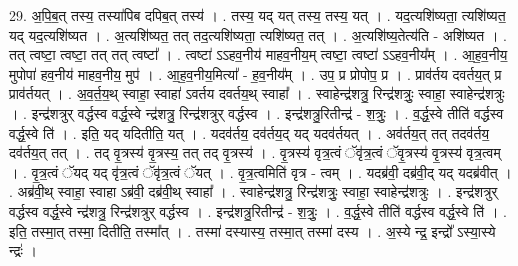 \documentclass[17pt]{extarticle}
\begin{document}
29. अ॒पि॒ब॒त् तस्य॒ तस्या॑पिब दपिब॒त् तस्य॑ । . तस्य॒ यद् यत् तस्य॒ तस्य॒ यत् । . यद॒त्यशि॑ष्यता॒ त्यशि॑ष्यत॒ यद् यद॒त्यशि॑ष्यत । . अ॒त्यशि॑ष्यत॒ तत् तद॒त्यशि॑ष्यता॒ त्यशि॑ष्यत॒ तत् । . अ॒त्यशि॑ष्य॒तेत्य॑ति - अशि॑ष्यत । . तत् त्वष्टा॒ त्वष्टा॒ तत् तत् त्वष्टा᳚ । . त्वष्टा॑ ऽऽहव॒नीय॑ माहव॒नीय॒म् त्वष्टा॒ त्वष्टा॑ ऽऽहव॒नीय᳚म् । . आ॒ह॒व॒नीय॒ मुपोपा॑ हव॒नीय॑ माहव॒नीय॒ मुप॑ । . आ॒ह॒व॒नीय॒मित्या᳚ - ह॒व॒नीय᳚म् । . उप॒ प्र प्रोपोप॒ प्र । . प्राव॑र्तय दवर्तय॒त् प्र प्राव॑र्तयत् । . अ॒व॒र्त॒य॒थ् स्वाहा॒ स्वाहा॑ ऽवर्तय दवर्तय॒थ् स्वाहा᳚ । . स्वाहेन्द्र॑शत्रु॒ रिन्द्र॑शत्रुः॒ स्वाहा॒ स्वाहेन्द्र॑शत्रुः । . इन्द्र॑शत्रुर् वर्द्धस्व वर्द्ध॒स्वे न्द्र॑शत्रु॒ रिन्द्र॑शत्रुर् वर्द्धस्व । . इन्द्र॑शत्रु॒रितीन्द्र॑ - श॒त्रुः॒ । . व॒र्द्ध॒स्वे तीति॑ वर्द्धस्व वर्द्ध॒स्वे ति॑ । . इति॒ यद् यदितीति॒ यत् । . यदव॑र्तय॒ दव॑र्तय॒द् यद् यदव॑र्तयत् । . अव॑र्तय॒त् तत् तदव॑र्तय॒ दव॑र्तय॒त् तत् । . तद् वृ॒त्रस्य॑ वृ॒त्रस्य॒ तत् तद् वृ॒त्रस्य॑ । . वृ॒त्रस्य॑ वृत्र॒त्वं ॅवृ॑त्र॒त्वं ॅवृ॒त्रस्य॑ वृ॒त्रस्य॑ वृत्र॒त्वम् । . वृ॒त्र॒त्वं ॅयद् यद् वृ॑त्र॒त्वं ॅवृ॑त्र॒त्वं ॅयत् । . वृ॒त्र॒त्वमिति॑ वृत्र - त्वम् । . यदब्र॑वी॒ दब्र॑वी॒द् यद् यदब्र॑वीत् । . अब्र॑वी॒थ् स्वाहा॒ स्वाहा ऽब्र॑वी॒ दब्र॑वी॒थ् स्वाहा᳚ । . स्वाहेन्द्र॑शत्रु॒ रिन्द्र॑शत्रुः॒ स्वाहा॒ स्वाहेन्द्र॑शत्रुः । . इन्द्र॑शत्रुर् वर्द्धस्व वर्द्ध॒स्वे न्द्र॑शत्रु॒ रिन्द्र॑शत्रुर् वर्द्धस्व । . इन्द्र॑शत्रु॒रितीन्द्र॑ - श॒त्रुः॒ । . व॒र्द्ध॒स्वे तीति॑ वर्द्धस्व वर्द्ध॒स्वे ति॑ । . इति॒ तस्मा॒त् तस्मा॒ दितीति॒ तस्मा᳚त् । . तस्मा॑ दस्यास्य॒ तस्मा॒त् तस्मा॑ दस्य । . अ॒स्ये न्द्र॒ इन्द्रो᳚ ऽस्या॒स्ये न्द्रः॑ । \newline
\end{document}
